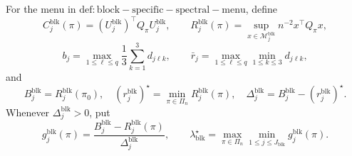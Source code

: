 For the menu in \(\mathrm{def:block-specific-spectral-menu}\), define
\[
C_j^{\mathrm{blk}}(\pi)
=(U_j^{\mathrm{blk}})^\top Q_\pi U_j^{\mathrm{blk}},
\qquad
R_j^{\mathrm{blk}}(\pi)
=\sup_{x\in\mathcal M_j^{\mathrm{blk}}}n^{-2}x^\top Q_\pi x,
\]
\[
b_j=\max_{1\le\ell\le q}\frac13\sum_{k=1}^3d_{j\ell k},
\qquad
\bar r_j=\max_{1\le\ell\le q}\min_{1\le k\le3}d_{j\ell k},
\]
and
\[
B_j^{\mathrm{blk}}=R_j^{\mathrm{blk}}(\pi_0),
\quad
(r_j^{\mathrm{blk}})^\star=\min_{\pi\in\Pi_n}R_j^{\mathrm{blk}}(\pi),
\quad
\Delta_j^{\mathrm{blk}}=B_j^{\mathrm{blk}}-(r_j^{\mathrm{blk}})^\star.
\]
Whenever \(\Delta_j^{\mathrm{blk}}>0\), put
\[
g_j^{\mathrm{blk}}(\pi)
=\frac{B_j^{\mathrm{blk}}-R_j^{\mathrm{blk}}(\pi)}{\Delta_j^{\mathrm{blk}}},
\qquad
\lambda_{\mathrm{blk}}^\star
=\max_{\pi\in\Pi_n}\min_{1\le j\le J_{\mathrm{blk}}}g_j^{\mathrm{blk}}(\pi).
\]